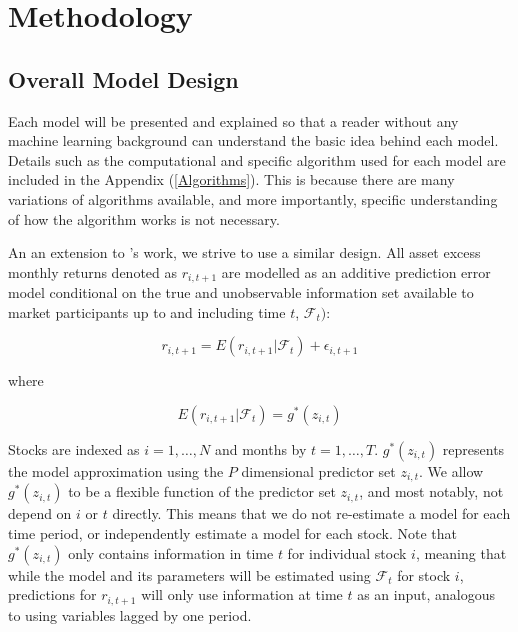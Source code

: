 \documentclass[a4paper, table]{article}
\begin{document}


\section{Methodology}

\subsection{Overall Model Design}

Each model will be presented and explained so that a reader without any machine learning background can understand the basic idea behind each model. Details such as the computational and specific algorithm used for each model are included in the Appendix (\ref{Algorithms}). This is because there are many variations of algorithms available, and more importantly, specific understanding of how the algorithm works is not necessary. 

An an extension to \cite{gu_empirical_2018}'s work, we strive to use a similar design. All asset excess monthly returns denoted as $r_{i, t+1}$ are modelled as an additive prediction error model conditional on the true and unobservable information set available to market participants up to and including time $t$, $\mathcal{F}_t)$:

\begin{equation}
	r_{i, t+1} = E(r_{i, t+1} | \mathcal{F}_t) + \epsilon_{i, t+1}
\end{equation}

where 

\begin{equation}
	E(r_{i, t+1} | \mathcal{F}_t) = g^*(z_{i,t})
\end{equation}

Stocks are indexed as $i = 1, \dots, N$ and months by $t = 1, \dots, T$. $g^*(z_{i,t})$ represents the model approximation using the $P$ dimensional predictor set $z_{i,t}$. We allow $g^*(z_{i,t})$ to be a flexible function of the predictor set $z_{i,t}$, and most notably, not depend on $i$ or $t$ directly. This means that we do not re-estimate a model for each time period, or independently estimate a model for each stock. Note that $g^*(z_{i,t})$ only contains information in time $t$ for individual stock $i$, meaning that while the model and its parameters will be estimated using $\mathcal{F}_t$ for stock $i$, predictions for $r_{i, t+1}$ will only use information at time $t$ as an input, analogous to using variables lagged by one period. 
\end{document}
